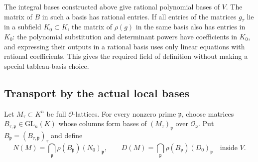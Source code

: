 The integral bases constructed above give rational polynomial bases of
$V$. The matrix of $B$ in such a basis has rational entries. If all
entries of the matrices $g_\tau$ lie in a subfield $K_0\subset K$,
the matrix of $\rho(g)$ in the same basis also has entries in $K_0$:
the polynomial substitution and determinant powers have coefficients
in $K_0$, and expressing their outputs in a rational basis uses only
linear equations with rational coefficients. This gives the required
field of definition without making a special tableau-basis choice.

\subsection{Transport by the actual local bases}

Let $M_\tau\subset K^n$ be full $\mathcal O$-lattices. For every
nonzero prime $\mathfrak p$, choose matrices
$B_{\tau,\mathfrak p}\in\mathrm{GL}_n(K)$ whose columns form bases
of $(M_\tau)_{\mathfrak p}$ over $\mathcal O_{\mathfrak p}$.
Put $B_{\mathfrak p}=(B_{\tau,\mathfrak p})_\tau$ and define
\begin{equation}\label{coef:transport}
 N(M)=\bigcap_{\mathfrak p}\rho(B_{\mathfrak p})(N_0)_{\mathfrak p},
 \qquad
 D(M)=\bigcap_{\mathfrak p}\rho(B_{\mathfrak p})(D_0)_{\mathfrak p}
                         \quad\text{inside }V.
\end{equation}

